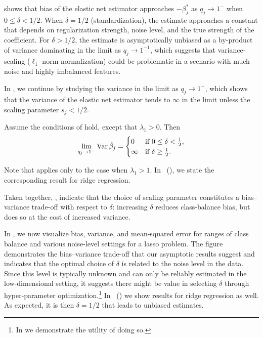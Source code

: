  shows that bias of the elastic net estimator approaches
\(-\beta_j^*\) as \(q_j \rightarrow 1^-\) when \(0 \leq \delta < 1/2\). When \(\delta =
1/2\) (standardization), the estimate approaches a constant that depends on regularization
strength, noise level, and the true strength of the coefficient. For \(\delta > 1/2\), the
estimate is asymptotically unbiased as a by-product of variance dominating in the limit as
\(q_j \rightarrow 1^{-1}\), which suggests that variance-scaling (\(\ell_1\)-norm
normalization) could be problematic in a scenario with much noise and highly imbalanced
features.

In , we continue by studying the variance in the limit as
\(q_j \rightarrow 1^-\), which shows that the variance of the elastic net estimator tends
to \(\infty\) in the limit unless the scaling parameter \(s_j < 1/2\).

\begin{theorem}
  \label{thm:classbalance-variance}
  Assume the conditions of  hold, except that
  \(\lambda_1 > 0\). Then
  \[
    \lim_{q_j \rightarrow 1^-} \operatorname{Var} \hat{\beta}_j =
    \begin{cases}
      0      & \text{if } 0 \leq \delta < \frac{1}{2}, \\
      \infty & \text{if } \delta \geq \frac{1}{2}.
    \end{cases}
  \]
\end{theorem}

Note that  applies only to the case when \(\lambda_1 > 1\).
In ~(), we state the corresponding result
for ridge regression.

Taken together, ,
indicate that the choice of scaling parameter constitutes a bias--variance trade-off with
respect to \(\delta\): increasing \(\delta\) reduces class-balance bias, but does so at the
cost of increased variance.

In , we now visualize bias, variance, and mean-squared
error for ranges of class balance and various noise-level settings for a lasso problem. The
figure demonstrates the bias--variance trade-off that our asymptotic results suggest and
indicates that the optimal choice of \(\delta\) is related to the noise level in the data.
Since this level is typically unknown and can only be reliably estimated in the
low-dimensional setting, it suggests there might be value in selecting \(\delta\) through
hyper-parameter optimization.\footnote{In  we demonstrate
  the utility of doing so.} In
~() we show
results for ridge regression as well. As expected, it is then \(\delta = 1/2\) that leads
to unbiased estimates.

